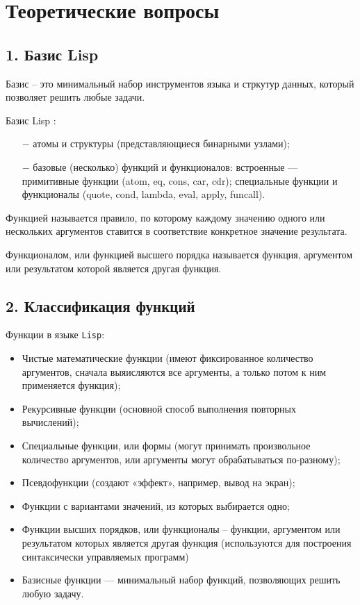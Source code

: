 \section*{Теоретические вопросы}
\subsection*{1. Базис Lisp}

Базис -- это минимальный набор инструментов языка и стркутур данных, который позволяет решить любые задачи.

Базис Lisp :

\begin{itemize}
	\item[$-$] атомы и структуры (представляющиеся бинарными узлами);
	\item[$-$] базовые (несколько) функций и функционалов: встроенные — примитивные 
	функции (atom, eq, cons, car, cdr); специальные функции и функционалы (quote, 
	cond, lambda, eval, apply, funcall).
\end{itemize}
	
Функцией называется правило, по которому каждому значению одного или нескольких  аргументов ставится в соответствие конкретное значение результата.

Функционалом, или функцией высшего порядка называется функция, аргументом или  результатом которой является другая функция.

\subsection*{2. Классификация функций}

Функции в языке {\texttt{Lisp}}:
\begin{itemize}
	\item Чистые математические функции (имеют фиксированное количество аргументов, сначала выяисляются все аргументы, а только потом к ним применяется функция);
	\item Рекурсивные функции (основной способ выполнения повторных вычислений);
	\item Специальные функции, или формы (могут принимать произвольное количество аргументов, или аргументы могут обрабатываться по-разному);
	\item Псевдофункции (создают «эффект», например, вывод на экран);
	\item Функции с вариантами значений, из которых выбирается одно;
	\item Функции высших порядков, или функционалы --  функции, аргументом или  результатом которых является другая функция (используются для построения синтаксически управляемых программ)
	\item Базисные функции --- минимальный набор функций, позволяющих решить любую задачу.
\end{itemize}

